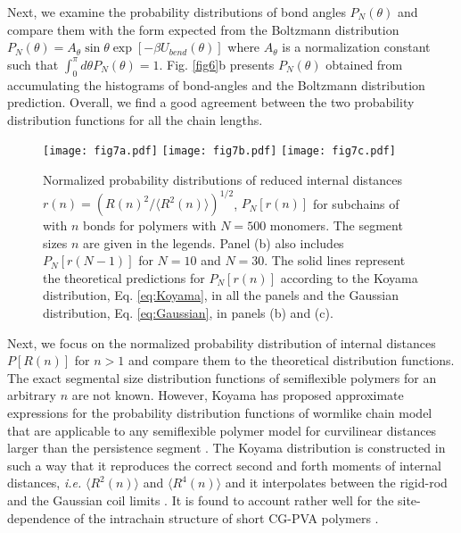\documentclass[pre,showpacs,notitlepage,twocolumn]{revtex4-1}
\begin{document}
%
Next, we  examine the probability distributions of bond angles $P_N(\theta)$ and compare them with the form  expected from the Boltzmann distribution $P_N(\theta)= A_{\theta} \sin \theta  \exp[-\beta U_{bend} (\theta)]$ where $A_{\theta}$
is a normalization constant such that $\int_{0}^{\pi} d \theta P_N(\theta)=1$. Fig. \ref{fig6}b presents $P_N(\theta)$ obtained from accumulating the histograms of bond-angles  and the Boltzmann distribution prediction.
Overall, we find 
a good agreement between the two probability distribution functions  for all the chain lengths. 


%
\begin{figure*}[t]
\texttt{[image: fig7a.pdf]}
\texttt{[image: fig7b.pdf]}
\texttt{[image: fig7c.pdf]}
\caption{Normalized probability distributions of  reduced internal  distances $r(n)=(R(n)^2/ \langle R^2(n) \rangle)^{1/2}$, $P_N[r(n)]$  
for subchains of with $n$ bonds for polymers with $N=500$ monomers. The segment sizes $n$ are given in the legends. Panel (b) also includes $P_N[r(N-1)]$
for $N=10$ and $N=30$. The solid lines represent the theoretical predictions for 
$P_N[r(n)]$  according to the Koyama distribution, Eq. \eqref{eq:Koyama}, in all the panels and the   Gaussian distribution, Eq. \eqref{eq:Gaussian}, in panels (b) and (c).  }
\label{fig7} 
\end{figure*}
%
 
Next, we focus on the normalized probability distribution of internal distances $P[R(n)]$ for   $n>1$ and compare them to the theoretical distribution functions. 
The exact segmental size  distribution functions of  semiflexible polymers for  an arbitrary $n$ are not known. However, Koyama has proposed approximate 
expressions for the probability distribution  functions of   wormlike  chain model \cite{Koyama0} that are applicable to any semiflexible polymer model  for curvilinear distances larger than the persistence segment \cite{Koyama}.
The Koyama distribution  is constructed in such a way that it reproduces the correct  second and forth moments of internal distances, {\it i.e.} $\langle R^2(n) \rangle$ and $\langle R^4(n) \rangle$ and it interpolates between 
the rigid-rod and the Gaussian coil limits \cite{Koyama}. It is found to account rather well for the site-dependence of the intrachain structure of short CG-PVA polymers \cite{Vettorel2007}.
 
\end{document}
